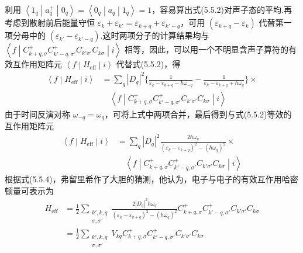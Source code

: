 利用 $\left\langle 1_q\middle|a_q^{+}\middle|0_q\right\rangle=\left\langle 0_q\middle|a_q\middle|1_q\right\rangle=1$，容易算出式(5.5.2)对声子态的平均.再考虑到散射前后能量守恒 $\varepsilon_k+\varepsilon_{k'}=\varepsilon_{k+q}+\varepsilon_{k'-q}$，可用 $\left(\varepsilon_{k+q}-\varepsilon_k\right)$ 代替第一项分母中的 $\left(\varepsilon_{k'}-\varepsilon_{k'-q}\right)$.这时两项分子的计算结果均与 $\left\langle f\middle|C_{k+q,\sigma}^{+}C_{k'-q,\sigma'}^{+}C_{k'\sigma'}C_{k\sigma}\middle|i\right\rangle$ 相等，因此，可以用一个不明显含声子算符的有效互作用矩阵元 $\left\langle f\middle|H_{\mathrm{eff}}\middle|i\right\rangle$ 代替式(5.5.2)，得
\begin{equation}
\begin{aligned}
  \left\langle f\middle|H_{\mathrm{eff}}\middle|i\right\rangle
  &=\sum_{q}\left|D_q\right|^2\biggl\{\frac{1}{\varepsilon_k-\varepsilon_{k+q}-\hbar\omega_{-q}}
  -\frac{1}{\varepsilon_k-\varepsilon_{k+q}+\hbar\omega_q}\biggr\}\times\\
  &\quad\left\langle f\middle|C_{k+q,\sigma}^{+}C_{k'-q,\sigma'}^{+}C_{k'\sigma'}C_{k\sigma}\middle|i\right\rangle
\end{aligned}
\end{equation}
由于时间反演对称 $\omega_{-q}=\omega_q$，可将上式中两项合并，最后得到与式(5.5.2)等效的互作用矩阵元
\begin{equation}
\begin{aligned}
  \left\langle f\middle|H_{\mathrm{eff}}\middle|i\right\rangle
  &=\sum_{q}\left|D_q\right|^2
  \frac{2\hbar\omega_q}{\left(\varepsilon_k-\varepsilon_{k+q}\right)^2-\left(\hbar\omega_q\right)^2}\times\\
  &\quad\left\langle f\middle|C_{k+q,\sigma}^{+}C_{k'-q,\sigma'}^{+}C_{k'\sigma'}C_{k\sigma}\middle|i\right\rangle
\end{aligned}
\end{equation}
根据式(5.5.4)，弗留里希作了大胆的猜测，他认为，电子与电子的有效互作用哈密顿量可表示为
\begin{equation}
\begin{aligned}
  H_{\mathrm{eff}}&=\frac{1}{2}\sum_{\substack{k',k,q\\ \sigma,\sigma'}}
  \frac{2\left|D_q\right|^2\hbar\omega_q}
  {\left(\varepsilon_k-\varepsilon_{k+q}\right)^2-\left(\hbar\omega_q\right)^2}
  C_{k+q,\sigma}^{+}C_{k'-q,\sigma'}^{+}C_{k'\sigma'}C_{k\sigma}\\
  &=\frac{1}{2}\sum_{\substack{k',k,q\\ \sigma,\sigma'}}
  V_{kq}C_{k+q,\sigma}^{+}C_{k'-q,\sigma'}^{+}C_{k'\sigma'}C_{k\sigma}
\end{aligned}
\end{equation}
